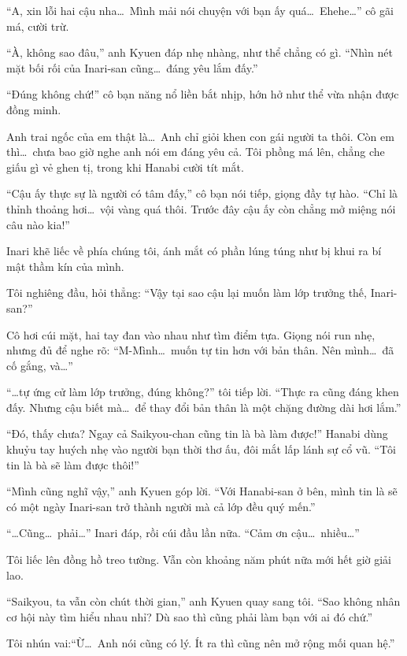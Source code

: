 \documentclass[../main.tex]{subfiles}
\begin{document}
``A, xin lỗi hai cậu nha\dots\ Mình mải nói chuyện với bạn ấy quá\dots\ Ehehe\dots'' cô gãi má, cười trừ.

``À, không sao đâu,'' anh Kyuen đáp nhẹ nhàng, như thể chẳng có gì. ``Nhìn nét mặt bối rối của Inari-san cũng\dots\ đáng yêu lắm đấy.''

``Đúng không chứ!'' cô bạn năng nổ liền bắt nhịp, hớn hở như thể vừa nhận được đồng minh.

Anh trai ngốc của em thật là\dots\ Anh chỉ giỏi khen con gái người ta thôi. Còn em thì\dots\ chưa bao giờ nghe anh nói em đáng yêu cả. Tôi phồng má lên, chẳng che giấu gì vẻ ghen tị, trong khi Hanabi cười tít mắt.

``Cậu ấy thực sự là người có tâm đấy,'' cô bạn nói tiếp, giọng đầy tự hào. ``Chỉ là thỉnh thoảng hơi\dots\ vội vàng quá thôi. Trước đây cậu ấy còn chẳng mở miệng nói câu nào kia!''

Inari khẽ liếc về phía chúng tôi, ánh mắt có phần lúng túng như bị khui ra bí mật thầm kín của mình.

Tôi nghiêng đầu, hỏi thẳng: ``Vậy tại sao cậu lại muốn làm lớp trưởng thế, Inari-san?''

Cô hơi cúi mặt, hai tay đan vào nhau như tìm điểm tựa. Giọng nói run nhẹ, nhưng đủ để nghe rõ: ``M-Mình\dots\ muốn tự tin hơn với bản thân. Nên mình\dots\ đã cố gắng, và\dots''

``\dots tự ứng cử làm lớp trưởng, đúng không?'' tôi tiếp lời. ``Thực ra cũng đáng khen đấy. Nhưng cậu biết mà\dots\ để thay đổi bản thân là một chặng đường dài hơi lắm.''

``Đó, thấy chưa? Ngay cả Saikyou-chan cũng tin là bà làm được!'' Hanabi dùng khuỷu tay huých nhẹ vào người bạn thời thơ ấu, đôi mắt lấp lánh sự cổ vũ. ``Tôi tin là bà sẽ làm được thôi!''

``Mình cũng nghĩ vậy,'' anh Kyuen góp lời. ``Với Hanabi-san ở bên, mình tin là sẽ có một ngày Inari-san trở thành người mà cả lớp đều quý mến.''

``\dots Cũng\dots\ phải\dots'' Inari đáp, rồi cúi đầu lần nữa. ``Cảm ơn cậu\dots\ nhiều\dots''

Tôi liếc lên đồng hồ treo tường. Vẫn còn khoảng năm phút nữa mới hết giờ giải lao.

``Saikyou, ta vẫn còn chút thời gian,'' anh Kyuen quay sang tôi. ``Sao không nhân cơ hội này tìm hiểu nhau nhỉ? Dù sao thì cũng phải làm bạn với ai đó chứ.''

Tôi nhún vai:``Ừ\dots\ Anh nói cũng có lý. Ít ra thì cũng nên mở rộng mối quan hệ.''
\end{document}
